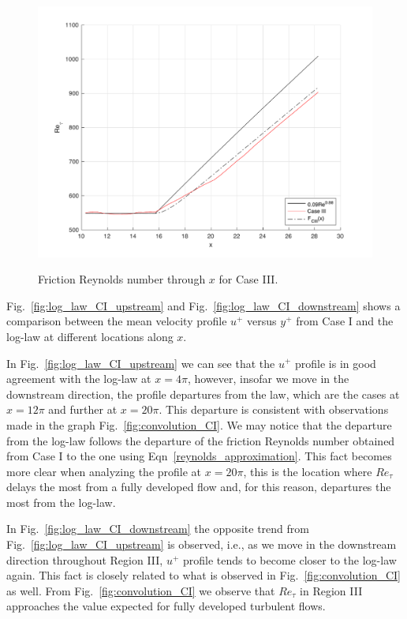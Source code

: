 \documentclass[twocolumn,10pt]{asme2e}
\begin{document}
\begin{figure}[t]
\centering
\scalebox{0.5}
{\includegraphics{convolution_CIII.pdf}}
\caption{Friction Reynolds number through \(x\) for Case III.}
\label{fig:convolution_CIII}
\end{figure}

Fig.~\ref{fig:log_law_CI_upstream} and Fig.~\ref{fig:log_law_CI_downstream} shows a comparison between the mean velocity profile \(u^+\) versus \(y^+\) from Case I and the log-law at different locations along \(x\).

In Fig.~\ref{fig:log_law_CI_upstream} we can see that the \(u^+\) profile is in good agreement with the log-law at \(x=4{\pi}\), however, insofar we move in the downstream direction, the profile departures from the law, which are the cases at \(x=12{\pi}\) and further at \(x=20{\pi}\). This departure is consistent with observations made in the graph Fig.~\ref{fig:convolution_CI}. We may notice that the departure from the log-law follows the departure of the friction Reynolds number obtained from Case I to the one using Eqn~\ref{reynolds_approximation}. This fact becomes more clear when analyzing the profile at \(x=20{\pi}\), this is the location where \(Re_{\tau}\) delays the most from a fully developed flow and, for this reason, departures the most from the log-law.

In Fig.~\ref{fig:log_law_CI_downstream} the opposite trend from Fig.~\ref{fig:log_law_CI_upstream} is observed, i.e., as we move in the downstream direction throughout Region III, \(u^+\) profile tends to become closer to the log-law again. This fact is closely related to what is observed in Fig.~\ref{fig:convolution_CI} as well. From Fig.~\ref{fig:convolution_CI} we observe that \(Re_{\tau}\) in Region III approaches the value expected for fully developed turbulent flows.
\end{document}
